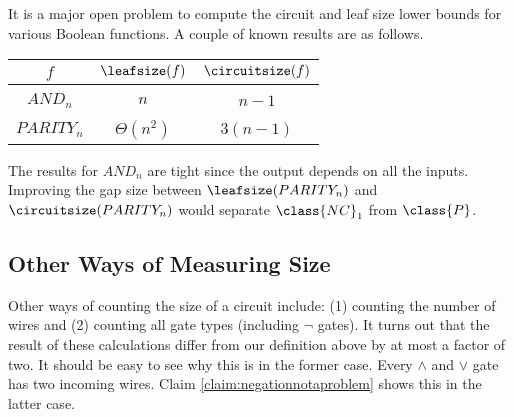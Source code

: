 	\begin{example}
		It is a major open problem to compute the circuit and leaf size lower bounds for various Boolean functions. A couple of known results are as follows.
		\begin{center}
			\begin{tabular}{c|c|c}
				$f$ 		& $\leafsize(f)$ 	& $\circuitsize(f)$\\ \hline
				&&\\[-1em]
				$AND_n$ 	& $n$ 				& $n-1$\\ \hline
				&&\\[-1em]
				$PARITY_n$ 	& $\Theta\left(n^2\right)$ 	& $3(n-1)$\\
			\end{tabular}
		\end{center}
		The results for $AND_n$ are tight since the output depends on all the inputs. Improving the gap size between $\leafsize(PARITY_n)$ and $\circuitsize(PARITY_n)$ would separate $\class{NC}_1$ from $\class{P}$.
	\end{example}

	\subsection{Other Ways of Measuring Size}
	Other ways of counting the size of a circuit include: (1) counting the number of wires and (2) counting all gate types (including $\lnot$ gates). It turns out that the result of these calculations differ from our definition above by at most a factor of two. It should be easy to see why this is in the former case. Every $\land$ and $\lor$ gate has two incoming wires. Claim \ref{claim:negationnotaproblem} shows this in the latter case.
	
